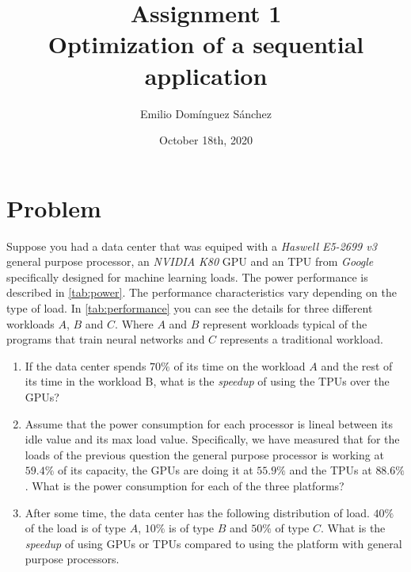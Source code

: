 \documentclass[
    12pt, %
]{fphw}
\title{Assignment 1 \\ Optimization of a sequential application} %
\author{Emilio Domínguez Sánchez} %
\date{October 18th, 2020} %
\institute{University of Murcia \\ Faculty of Informatics} %
\begin{document}
\maketitle %


\section*{Problem}

\begin{problem}

    Suppose you had a data center that was equiped with
a \textit{Haswell E5-2699 v3} general purpose processor,
an \textit{NVIDIA K80} GPU and
an TPU from \textit{Google} specifically designed for machine learning loads.
The power performance is described in \cref{tab:power}.
The performance characteristics vary depending on the type of load.
In \cref{tab:performance} you can see the details
for three different workloads $A$, $B$ and $C$.
Where $A$ and $B$ represent workloads typical of the programs that train neural networks
and $C$ represents a traditional workload.

\begin{enumerate}
    \item If the data center spends $70\%$ of its time on the workload $A$
and the rest of its time in the workload B,
what is the \textit{speedup} of using the TPUs over the GPUs? %

    \item Assume that the power consumption for each processor is lineal between
its idle value and its max load value.
Specifically, we have measured that for the loads of the previous question
the general purpose processor is working at $59.4\%$ of its capacity,
the GPUs are doing it at $55.9\%$ and
the TPUs at $88.6\%$.
What is the power consumption for each of the three platforms?

    \item After some time, the data center has the following distribution of load.
$40\%$ of the load is of type $A$,
$10\%$ is of type $B$ and
$50\%$ of type $C$.
What is the \textit{speedup} of using GPUs or TPUs compared to using the platform
with general purpose processors.
\end{enumerate}

\end{problem}
\end{document}
